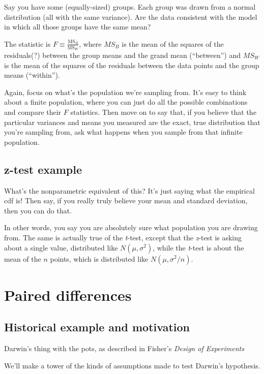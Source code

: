 Say you have some (equally-sized) groups. Each group was drawn from a
normal distribution (all with the same variance). Are the data
consistent with the model in which all those groups have the same mean?

The statistic is \(F \equiv \frac{\mathrm{MS}_B}{\mathrm{MS}_W}\), where
\(MS_B\) is the mean of the squares of the residuals(?) between the
group means and the grand mean (``between'') and \(MS_W\) is the mean of
the squares of the residuals between the data points and the group means
(``within'').

Again, focus on what's the population we're sampling from. It's easy to
think about a finite population, where you can just do all the possible
combinations and compare their \(F\) statistics. Then move on to say
that, if you believe that the particular variances and means you
measured are the exact, true distribution that you're sampling from, ask
what happens when you sample from that infinite population.

\subsection{z-test example}\label{z-test-example}

What's the nonparametric equivalent of this? It's just saying what the
empirical cdf is! Then say, if you really truly believe your mean and
standard deviation, then you can do that.

In other words, you say you are absolutely sure what population you are
drawing from. The same is actually true of the \emph{t}-test, except
that the \emph{z}-test is asking about a single value, distributed like
\(N(\mu, \sigma^2)\), while the \emph{t}-test is about the mean of the
\(n\) points, which is distributed like \(N(\mu, \sigma^2/n)\).

\section{Paired differences}\label{paired-differences}

\subsection{Historical example and
motivation}\label{historical-example-and-motivation}

Darwin's thing with the pots, as described in Fisher's \emph{Design of
Experiments}

We'll make a tower of the kinds of assumptions made to test Darwin's
hypothesis.

